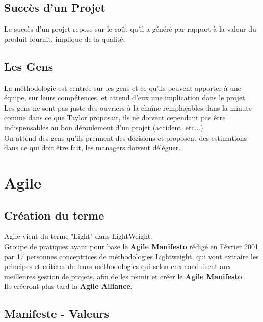 \documentclass{report}
\begin{document}
	\section{Succès d'un Projet}

		Le succès d'un projet repose sur le coût qu'il a généré par rapport à la valeur du produit fournit, implique de la qualité.\\

	\section{Les Gens}

		La méthodologie est centrée sur les gens et ce qu'ils peuvent apporter à une équipe, sur leurs compétences, et attend d'eux une implication dans le projet.\\
		Les gens ne sont pas juste des ouvriers à la chaîne remplaçables dans la minute comme dans ce que Taylor proposait, ils ne doivent cependant pas être indispensables au bon déroulement d'un projet (accident, etc...)\\

		On attend des gens qu'ils prennent des décisions et proposent des estimations dans ce qui doit être fait, les managers doivent déléguer.\\

\chapter{Agile}

	\section{Création du terme}

		Agile vient du terme "Light" dans LightWeight.\\

		Groupe de pratiques ayant pour base le \textbf{Agile Manifesto} rédigé en Février 2001 par 17 personnes conceptrices de méthodologies Lightweight, qui vont extraire les principes et critères de leurs méthodologies qui selon eux conduisent aux meilleures gestion de projets, afin de les réunir et créer le \textbf{Agile Manifesto}.\\
		Ils créeront plus tard la \textbf{Agile Alliance}.\\


	\section{Manifeste - Valeurs}
\end{document}
